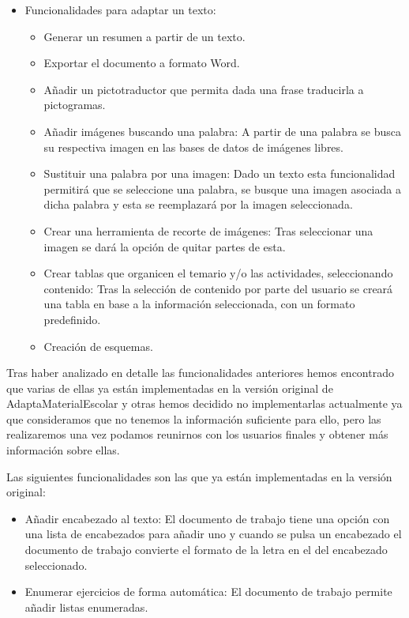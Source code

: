\begin{itemize}
  \item Funcionalidades para adaptar un texto:
        \begin{itemize}
          \item Generar un resumen a partir de un texto.
          \item Exportar el documento a formato Word.
          \item Añadir un pictotraductor que permita dada una frase traducirla a pictogramas.
          \item Añadir imágenes buscando una palabra: A partir de una palabra se busca su respectiva imagen en las bases de datos de imágenes libres.
          \item Sustituir una palabra por una imagen: Dado un texto esta funcionalidad permitirá que se seleccione una palabra, se busque una imagen asociada a dicha palabra y esta se reemplazará por la imagen seleccionada.
          \item Crear una herramienta de recorte de imágenes: Tras seleccionar una imagen se dará la opción de quitar partes de esta.
          \item Crear tablas que organicen el temario y/o las actividades, seleccionando contenido: Tras la selección de contenido por parte del usuario se creará una tabla en base a la información seleccionada, con un formato predefinido.
          \item Creación de esquemas.
        \end{itemize}

\end{itemize}

Tras haber analizado en detalle las funcionalidades anteriores hemos encontrado que varias de ellas ya están implementadas en la versión original de AdaptaMaterialEscolar y otras hemos decidido no implementarlas actualmente ya que consideramos que no tenemos la información suficiente para ello, pero las realizaremos una vez podamos reunirnos con los usuarios finales y obtener más información sobre ellas.

Las siguientes funcionalidades son las que ya están implementadas en la versión original:
\begin{itemize}
  \item Añadir encabezado al texto: El documento de trabajo tiene una opción con una lista de encabezados para añadir uno y cuando se pulsa un encabezado el documento de trabajo convierte el formato de la letra en el del encabezado seleccionado.
  \item Enumerar ejercicios de forma automática: El documento de trabajo permite añadir listas enumeradas.
\end{itemize}

